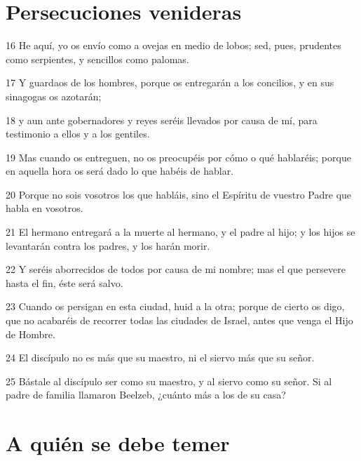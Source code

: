 \section*{Persecuciones venideras}

\par 16 He aquí, yo os envío como a ovejas en medio de lobos; sed, pues, prudentes como serpientes, y sencillos como palomas.
\par 17 Y guardaos de los hombres, porque os entregarán a los concilios, y en sus sinagogas os azotarán;
\par 18 y aun ante gobernadores y reyes seréis llevados por causa de mí, para testimonio a ellos y a los gentiles.
\par 19 Mas cuando os entreguen, no os preocupéis por cómo o qué hablaréis; porque en aquella hora os será dado lo que habéis de hablar.
\par 20 Porque no sois vosotros los que habláis, sino el Espíritu de vuestro Padre que habla en vosotros.
\par 21 El hermano entregará a la muerte al hermano, y el padre al hijo; y los hijos se levantarán contra los padres, y los harán morir.
\par 22 Y seréis aborrecidos de todos por causa de mi nombre; mas el que persevere hasta el fin, éste será salvo.
\par 23 Cuando os persigan en esta ciudad, huid a la otra; porque de cierto os digo, que no acabaréis de recorrer todas las ciudades de Israel, antes que venga el Hijo de Hombre.
\par 24 El discípulo no es más que su maestro, ni el siervo más que su señor.
\par 25 Bástale al discípulo ser como su maestro, y al siervo como su señor. Si al padre de familia llamaron Beelzeb, ¿cuánto más a los de su casa?

\section*{A quién se debe temer}

